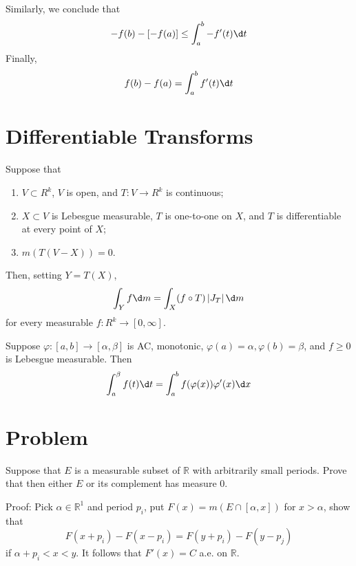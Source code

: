 \documentclass[12pt, a4paper, oneside]{book}
\begin{document}
\begin{theorem}
    Similarly, we conclude that
    \begin{equation*}
        -f(b)-\left[-f(a)\right] \leq \int_a^b -f^{\prime}(t) \d t
    \end{equation*}
    Finally,
    \begin{equation*}
        f(b)-f(a) = \int_a^b f^{\prime}(t) \d t
    \end{equation*}
\end{theorem}


\section{Differentiable Transforms}


\begin{theorem}
    Suppose that

    \begin{enumerate}[label=(\roman*)]
        \item  $ V \subset R^k$, $V$ is open, and $T: V \rightarrow R^k$ is continuous;
        \item  $X \subset V$ is Lebesgue measurable, $T$ is one-to-one on $X$, and $T$ is differentiable at every point of $X$;
        \item  $m(T(V-X))=0$.
    \end{enumerate}
    Then, setting $Y=T(X)$,
    \begin{equation*}
        \int_Y f \d m
        =
        \int_X (f \circ T)\left|J_T\right| \d m
    \end{equation*}
    for every measurable $f: R^k \rightarrow[0, \infty]$.
\end{theorem}



\begin{corollary}
    Suppose $\varphi:[a, b] \rightarrow[\alpha, \beta]$ is AC, monotonic, $\varphi(a)=\alpha, \varphi(b)=\beta$, and $f \geq 0$ is Lebesgue measurable. Then
    \begin{equation*}
        \int_a^\beta f(t) \d t
        =
        \int_a^b f(\varphi(x)) \varphi^{\prime}(x) \d x
    \end{equation*}
\end{corollary}

\section{Problem}


\begin{question}
    Suppose that $E$ is a measurable subset of $\mathbb{R}$ with arbitrarily small periods. Prove that then either $E$ or its complement has measure $0$.

    Proof:
    Pick $\alpha \in \mathbb{R}^1$ and period $p_i$, put
    $F(x)=m\left(E \cap[\alpha, x]\right)$
    for $x>\alpha$, show that
    \begin{equation*}
        F\left(x+p_i\right)-F\left(x-p_i\right)=F\left(y+p_i\right)-F\left(y-p_j\right)
    \end{equation*}
    if $\alpha+p_i<x<y$. It follows that $F'(x)=C$ a.e. on $\mathbb{R}$.
\end{question}
\end{document}
